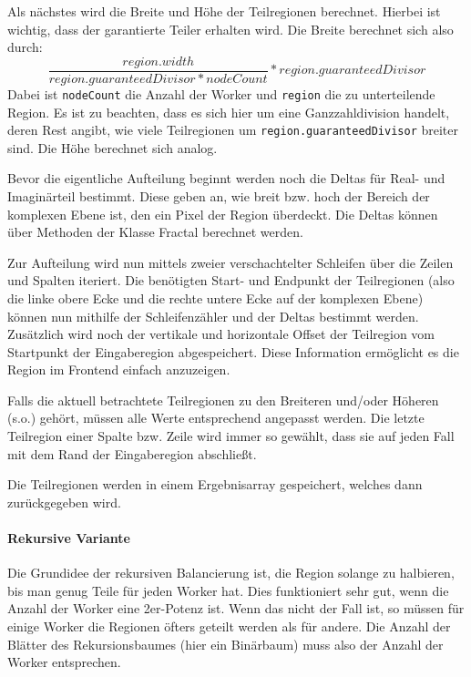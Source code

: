 Als nächstes wird die Breite und Höhe der Teilregionen berechnet. Hierbei ist wichtig, dass der garantierte Teiler erhalten wird.
Die Breite berechnet sich also durch:
\begin{equation*}
	\frac{region.width}{region.guaranteedDivisor * nodeCount} * region.guaranteedDivisor
\end{equation*}
Dabei ist \verb|nodeCount| die Anzahl der Worker und \verb|region| die zu unterteilende Region.
Es ist zu beachten, dass es sich hier um eine Ganzzahldivision handelt, deren Rest angibt, wie viele Teilregionen um \verb|region.guaranteedDivisor| breiter sind.
Die Höhe berechnet sich analog.

Bevor die eigentliche Aufteilung beginnt werden noch die Deltas für Real- und Imaginärteil bestimmt.
Diese geben an, wie breit bzw. hoch der Bereich der komplexen Ebene ist, den ein Pixel der Region überdeckt.
Die Deltas können über Methoden der Klasse Fractal berechnet werden.

Zur Aufteilung wird nun mittels zweier verschachtelter Schleifen über die Zeilen und Spalten iteriert.
Die benötigten Start- und Endpunkt der Teilregionen (also die linke obere Ecke und die rechte untere Ecke auf der komplexen Ebene) können nun mithilfe der Schleifenzähler und der Deltas bestimmt werden.
Zusätzlich wird noch der vertikale und horizontale Offset der Teilregion vom Startpunkt der Eingaberegion abgespeichert. Diese Information ermöglicht es die Region im Frontend einfach anzuzeigen.

Falls die aktuell betrachtete Teilregionen zu den Breiteren und/oder Höheren (s.o.) gehört, müssen alle Werte entsprechend angepasst werden.
Die letzte Teilregion einer Spalte bzw. Zeile wird immer so gewählt, dass sie auf jeden Fall mit dem Rand der Eingaberegion abschließt.

Die Teilregionen werden in einem Ergebnisarray gespeichert, welches dann zurückgegeben wird.

\paragraph*{Rekursive Variante}\label{lastbalancierung_naiv_rekursion}
Die Grundidee der rekursiven Balancierung ist, die Region solange zu halbieren, bis man genug Teile für jeden Worker hat.
Dies funktioniert sehr gut, wenn die Anzahl der Worker eine 2er-Potenz ist.
Wenn das nicht der Fall ist, so müssen für einige Worker die Regionen öfters geteilt werden als für andere.
Die Anzahl der Blätter des Rekursionsbaumes (hier ein Binärbaum) muss also der Anzahl der Worker entsprechen.

